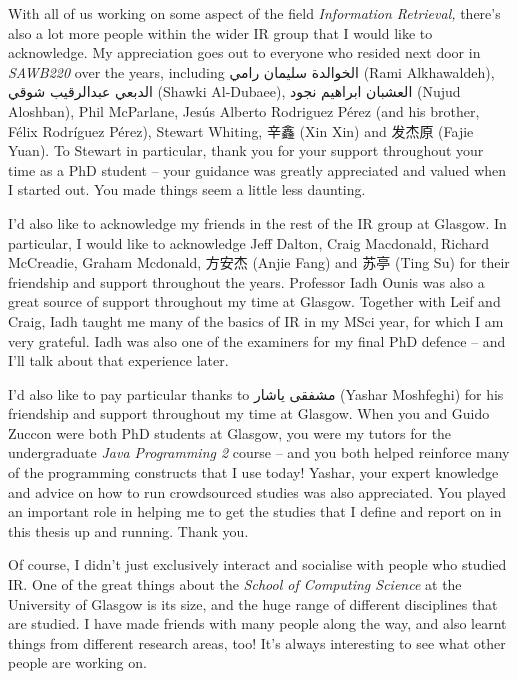 \begin{preamble}
With all of us working on some aspect of the field \emph{Information Retrieval,} there's also a lot more people within the wider IR group that I would like to acknowledge. My appreciation goes out to everyone who resided next door in \emph{SAWB220} over the years, including {\arabicfont  الخوالدة سليمان رامي} (Rami Alkhawaldeh), {\arabicfont الدبعي عبدالرقيب شوقي} (Shawki Al-Dubaee), {\arabicfont العشبان ابراهيم نجود} (Nujud Aloshban), Phil McParlane, Jes\'{u}s Alberto Rodriguez P\'{e}rez (and his brother, F\'{e}lix Rodr\'{i}guez P\'{e}rez), Stewart Whiting, {\asianfont 辛鑫} (Xin Xin) and {\asianfont 发杰原} (Fajie Yuan). To Stewart in particular, thank you for your support throughout your time as a PhD student -- your guidance was greatly appreciated and valued when I started out. You made things seem a little less daunting.

I'd also like to acknowledge my friends in the rest of the IR group at Glasgow. In particular, I would like to acknowledge Jeff Dalton, Craig Macdonald, Richard McCreadie, Graham Mcdonald, {\asianfont 方安杰} (Anjie Fang) and {\asianfont 苏亭} (Ting Su) for their friendship and support throughout the years. Professor Iadh Ounis was also a great source of support throughout my time at Glasgow. Together with Leif and Craig, Iadh taught me many of the basics of IR in my MSci year, for which I am very grateful. Iadh was also one of the examiners for my final PhD defence -- and I'll talk about that experience later.

I'd also like to pay particular thanks to {\farsifont مشفقى ياشار} (Yashar Moshfeghi) for his friendship and support throughout my time at Glasgow. When you and Guido Zuccon were both PhD students at Glasgow, you were my tutors for the undergraduate \emph{Java Programming 2} course -- and you both helped reinforce many of the programming constructs that I use today! Yashar, your expert knowledge and advice on how to run crowdsourced studies was also appreciated. You played an important role in helping me to get the studies that I define and report on in this thesis up and running. Thank you.

Of course, I didn't just exclusively interact and socialise with people who studied IR. One of the great things about the \emph{School of Computing Science} at the University of Glasgow is its size, and the huge range of different disciplines that are studied. I have made friends with many people along the way, and also learnt things from different research areas, too! It's always interesting to see what other people are working on.


\end{preamble}
